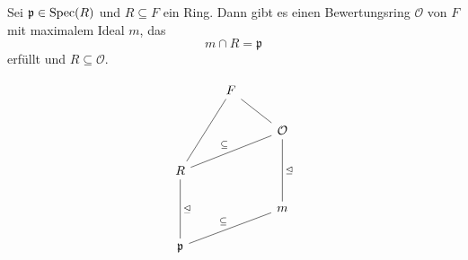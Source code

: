 \begin{theorem}[Chevalley]
    Sei $\mathfrak{p} \in \operatorname{Spec}(R)$ und $R \subseteq F$ ein Ring. Dann gibt es einen Bewertungsring $\mathcal{O}$ von $F$ mit 
    maximalem Ideal $m$, das $$m \cap R = \mathfrak{p}$$ erfüllt und $R \subseteq \mathcal{O}$.

    $$\begin{tikzcd}
        & F \arrow[ddl, dash] \drar[dash] &\\
        & & \O \arrow[dd, dash,  "\ideal"]\\
        R \arrow[urr, dash, "\subseteq"] \arrow[dd, dash, "\ideal"]& &\\
        && m\\
        \mathfrak{p} \arrow[urr, dash, "\subseteq"]&&
    \end{tikzcd}$$
\end{theorem}
